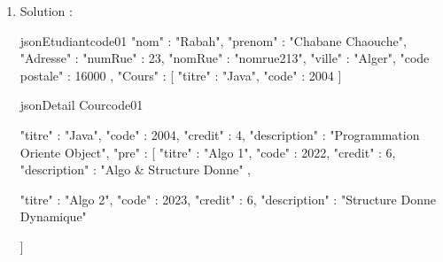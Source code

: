 \documentclass{article}
\begin{document}
\begin{enumerate}
\begin{prettyBox}{Modélisation}{myblue}
\begin{itemize}
        \item \textbf{Centre Cours} : les prérequis ne sont pas fortement imbriques. Cependant, il y a une redondance des informations 
        concernant les étudiants inscrits.
    \end{itemize}
\end{prettyBox}\vspace{0.5cm}


\item Solution :
\begin{multicols}{2}

\begin{codeInput}{json}{Etudiant}{code01}
{
    "nom" : "Rabah",
    "prenom" : "Chabane Chaouche",
    "Adresse" : { 
        "numRue" : 23,
        "nomRue" : "nomrue213",
        "ville" : "Alger",
        "code postale" : 16000
    },
    "Cours" : [{
        "titre" : "Java",
        "code" : 2004
    }]
}
\end{codeInput}

\columnbreak

\begin{codeInput}{json}{Detail Cour}{code01}
{
    "titre" : "Java",
    "code" : 2004,
    "credit" : 4,
    "description" : "Programmation Oriente Object",
    "pre" : [{ 
        "titre" : "Algo 1",
        "code" : 2022,
        "credit" : 6,
        "description" : "Algo & Structure Donne"
    },
    {
        "titre" : "Algo 2",
        "code" : 2023,
        "credit" : 6,
        "description" : "Structure Donne Dynamique"

    }]
}
\end{codeInput}

\end{multicols}



\end{enumerate}
\end{document}
